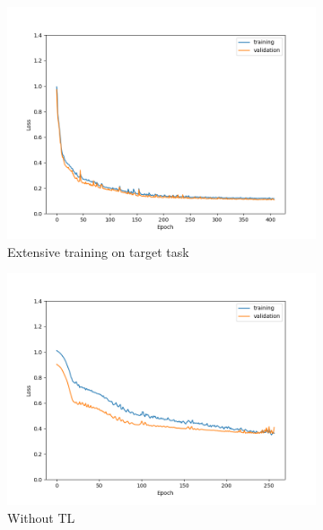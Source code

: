 \begin{figure}[ht!]
    \centering
    \begin{subfigure}{0.48\textwidth}
        \includegraphics[width=\textwidth]{./project3/figures/figure4a.png}
        \caption{Extensive training on target task} 
        \label{subfig3-4:extensive}
    \end{subfigure}\hfill
    \begin{subfigure}{0.48\textwidth}
        \includegraphics[width=\textwidth]{./project3/figures/figure4b.png}
        \caption{Without TL}
        \label{subfig3-4:without}
    \end{subfigure}
    \begin{subfigure}{0.48\textwidth}

\end{subfigure}
\end{figure}
